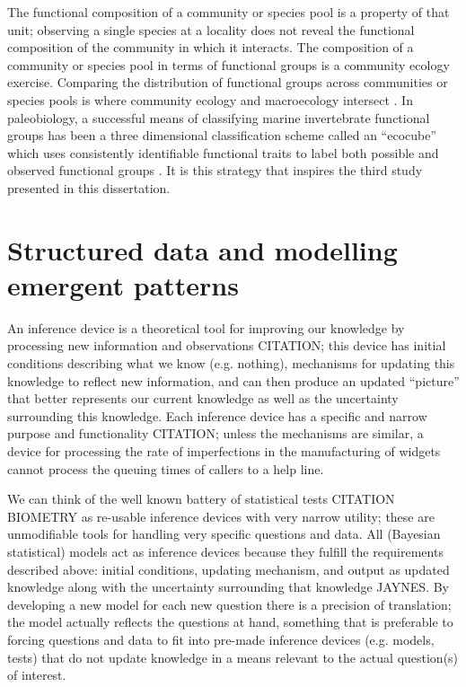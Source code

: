 The functional composition of a community or species pool is a property of that unit; observing a single species at a locality does not reveal the functional composition of the community in which it interacts. The composition of a community or species pool in terms of functional groups is a community ecology exercise. Comparing the distribution of functional groups across communities or species pools is where community ecology and macroecology intersect \citep{Mcgill2006,Brown1995,Smith2008a}. In paleobiology, a successful means of classifying marine invertebrate functional groups has been a three dimensional classification scheme called an ``ecocube'' which uses consistently identifiable functional traits to label both possible and observed functional groups \citep{Bush2007,Bambach2007}. It is this strategy that inspires the third study presented in this dissertation.



\section{Structured data and modelling emergent patterns}



An inference device is a theoretical tool for improving our knowledge by processing new information and observations \citep{McElreath2016} CITATION; this device has initial conditions describing what we know (e.g. nothing), mechanisms for updating this knowledge to reflect new information, and can then produce an updated ``picture'' that better represents our current knowledge as well as the uncertainty surrounding this knowledge. Each inference device has a specific and narrow purpose and functionality \citep{McElreath2016} CITATION; unless the mechanisms are similar, a device for processing the rate of imperfections in the manufacturing of widgets cannot process the queuing times of callers to a help line.  

We can think of the well known battery of statistical tests CITATION \uppercase{Biometry} as re-usable inference devices with very narrow utility; these are unmodifiable tools for handling very specific questions and data. All (Bayesian statistical) models act as inference devices because they fulfill the requirements described above: initial conditions, updating mechanism, and output as updated knowledge along with the uncertainty surrounding that knowledge \citep{McElreath2016} JAYNES. By developing a new model for each new question there is a precision of translation; the model actually reflects the questions at hand, something that is preferable to forcing questions and data to fit into pre-made inference devices (e.g. models, tests) that do not update knowledge in a means relevant to the actual question(s) of interest.


